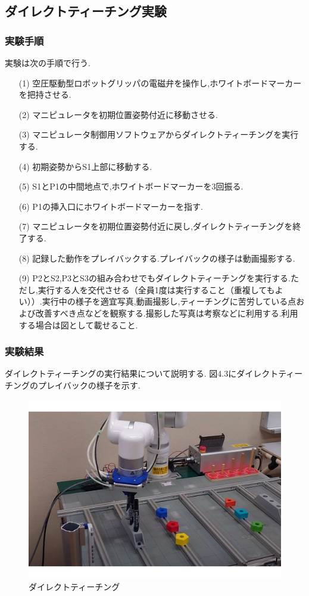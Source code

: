 \subsection{ダイレクトティーチング実験}

\subsubsection{実験手順}
実験は次の手順で行う.

\begin{enumerate}
  \item[(1)] 空圧駆動型ロボットグリッパの電磁弁を操作し,ホワイトボードマーカーを把持させる.
  \item[(2)] マニピュレータを初期位置姿勢付近に移動させる.
  \item[(3)] マニピュレータ制御用ソフトウェアからダイレクトティーチングを実行する.
  \item[(4)] 初期姿勢からS1上部に移動する.
  \item[(5)] S1とP1の中間地点で,ホワイトボードマーカーを3回振る.
  \item[(6)] P1の挿入口にホワイトボードマーカーを指す.
  \item[(7)] マニピュレータを初期位置姿勢付近に戻し,ダイレクトティーチングを終了する.
  \item[(8)] 記録した動作をプレイバックする.プレイバックの様子は動画撮影する.
  \item[(9)] P2とS2,P3とS3の組み合わせでもダイレクトティーチングを実行する.ただし,実行する人を交代させる（全員1度は実行すること（重複してもよい））.実行中の様子を適宜写真,動画撮影し,ティーチングに苦労している点および改善すべき点などを観察する.撮影した写真は考察などに利用する.利用する場合は図として載せること.
\end{enumerate}

\subsubsection{実験結果}
ダイレクトティーチングの実行結果について説明する.
図4.3にダイレクトティーチングのプレイバックの様子を示す.

\begin{figure}[h]
  \centering
  \includegraphics[scale=0.3]{sozai/4.pdf}
  \caption{ダイレクトティーチング}
\end{figure}

